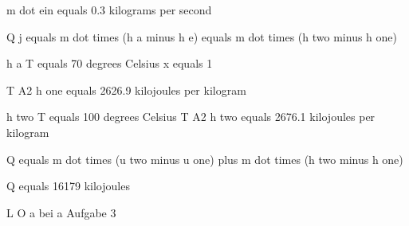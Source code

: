 m dot ein equals 0.3 kilograms per second

Q j equals m dot times (h a minus h e) equals m dot times (h two minus h one)

h a T equals 70 degrees Celsius x equals 1

T A2 h one equals 2626.9 kilojoules per kilogram

h two T equals 100 degrees Celsius T A2 h two equals 2676.1 kilojoules per kilogram

Q equals m dot times (u two minus u one) plus m dot times (h two minus h one)

Q equals 16179 kilojoules

L O a bei a Aufgabe 3